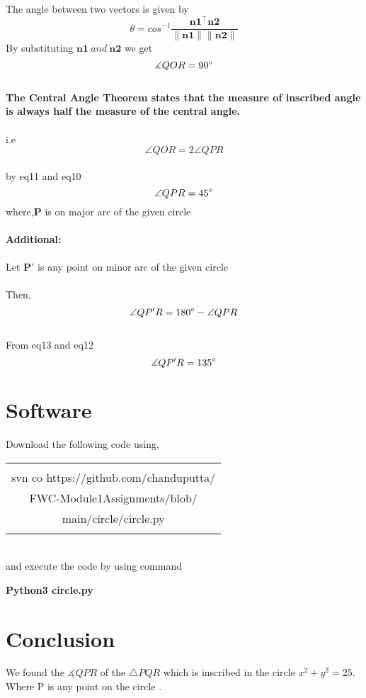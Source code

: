 \documentclass[journal,12pt,twocolumn]{article}
\let\vec\mathbf
\begin{document}
The angle between two vectors is given by
\begin{equation}
\theta = {cos}^{-1}\frac{\vec{n1^{\top}} \vec{n2}}{\vec{\|n1\| \|n2\|}}
   \label{eq-9}
\end{equation}
By substituting $\vec{n1} \:and\: \vec{n2} $ we get
\begin{equation}
 \measuredangle{QOR} = 90\degree
  \label{eq-10}
\end{equation}
\\
\textbf{The Central Angle Theorem states that the measure of inscribed angle is always half the measure of the central angle.}\\
 \\
 
 i.e
 \begin{equation}
 \angle{QOR} = 2\angle{QPR}
  \label{eq-11}
\end{equation}
\\
by eq11 and eq10 \\
\begin{equation}
	\angle{QPR} = 45\degree
	 \label{eq-12}
\end{equation}
where,$ \vec{P} $ is on major arc of the given circle
\\
\\
\textbf{Additional:}
\\
\\
Let $ \vec{P'} $ is any point on minor arc of the given circle 
\\\\
Then,
\begin{equation}
	 \angle{QP'R} = 180\degree - \angle{QPR}
	 \label{eq-13}
\end{equation}
 \\
 From eq13 and eq12
 \begin{equation}
    \measuredangle{QP'R} = 135\degree 
  \label{eq-14}
\end{equation}


 
\section{Software}
Download the following code using,
\begin{table}[h]
    \centering
    \begin{tabular}{|c|}
    \hline \\
         svn co https://github.com/chanduputta/\\FWC-Module1Assignments/blob/\\main/circle/circle.py  \\
         \\
\hline
    \end{tabular}
\end{table}
\\
and execute the code by using command
\begin{center}
\textbf{Python3  circle.py}
\\
\end{center}

\section{Conclusion}
\begin{center}
We found the  $ \measuredangle{QPR} $ of the $\triangle{PQR}$ which is inscribed in the circle $x^2 + y^2 = 25$. Where P is any point on the circle .
\end{center}
\end{document}

